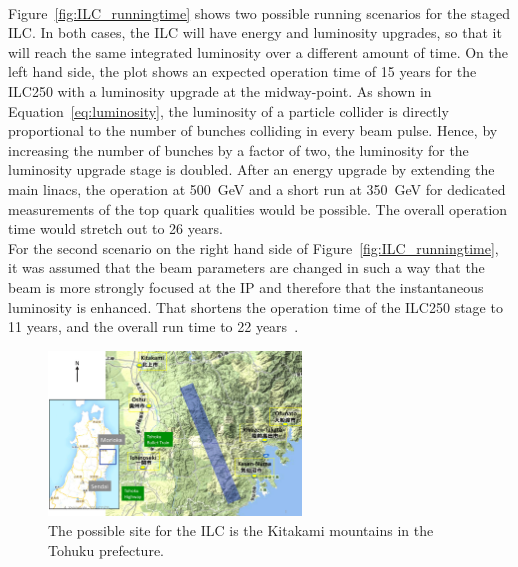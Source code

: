 \\Figure~\ref{fig:ILC_runningtime} shows two possible running scenarios for the staged ILC.
In both cases, the ILC will have energy and luminosity upgrades, so that it will reach the same integrated luminosity over a different amount of time.
On the left hand side, the plot shows an expected operation time of 15 years for the ILC250 with a luminosity upgrade at the midway-point.
As shown in Equation~\ref{eq:luminosity}, the luminosity of a particle collider is directly proportional to the number of bunches colliding in every beam pulse.
Hence, by increasing the number of bunches by a factor of two, the luminosity for the luminosity upgrade stage is doubled.
After an energy upgrade by extending the main linacs, the operation at \SI{500}{\GeV} and a short run at \SI{350}{\GeV} for dedicated measurements of the top quark qualities would be possible.
The overall operation time would stretch out to 26 years.\\
For the second scenario on the right hand side of Figure~\ref{fig:ILC_runningtime}, it was assumed that the beam parameters are changed in such a way that the beam is more strongly focused at the IP and therefore that the instantaneous luminosity is enhanced.
That shortens the operation time of the ILC250 stage to 11 years, and the overall run time to 22 years~\cite[p. 7]{PhysicsCase}.


\label{ILC:site}
\begin{figure}[h]
\centering
\includegraphics[width=0.6\textwidth]{Figures/ILC-site.png}
\caption[Possible site for the ILC]{The possible site for the ILC is the Kitakami mountains in the Tohuku prefecture.\cite{Kitakami}}
\label{fig:ILC_Site}
\end{figure}
